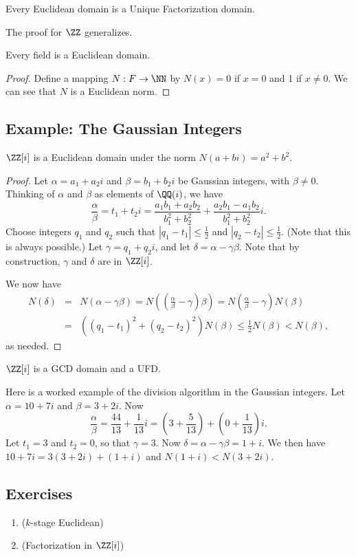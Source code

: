 \documentclass{article}
\begin{document}
\begin{prop}
Every Euclidean domain is a Unique Factorization domain.
\end{prop}

The proof for $\ZZ$ generalizes.

\begin{prop}
Every field is a Euclidean domain.
\end{prop}

\begin{proof}
Define a mapping $N : F \rightarrow \NN$ by $N(x) = 0$ if $x = 0$ and 1 if $x \neq 0$. We can see that $N$ is a Euclidean norm.
\end{proof}

\subsection*{Example: The Gaussian Integers}

\begin{prop}
$\ZZ[i]$ is a Euclidean domain under the norm $N(a+bi) = a^2 + b^2$.
\end{prop}

\begin{proof}
Let $\alpha = a_1 + a_2 i$ and $\beta = b_1 + b_2 i$ be Gaussian integers, with $\beta \neq 0$. Thinking of $\alpha$ and $\beta$ as elements of $\QQ(i)$, we have \[ \frac{\alpha}{\beta} = t_1 + t_2 i = \frac{a_1b_1 + a_2b_2}{b_1^2 + b_2^2} + \frac{a_2b_1 - a_1b_2}{b_1^2 + b_2^2} i. \] Choose integers $q_1$ and $q_2$ such that $|q_1 - t_1| \leq \frac{1}{2}$ and $|q_2 - t_2| \leq \frac{1}{2}$. (Note that this is always possible.) Let $\gamma = q_1 + q_2 i$, and let $\delta = \alpha - \gamma\beta$. Note that by construction, $\gamma$ and $\delta$ are in $\ZZ[i]$.

We now have
\begin{eqnarray*}
N(\delta) & = & N(\alpha - \gamma\beta) = N\left((\frac{\alpha}{\beta} - \gamma)\beta\right) = N(\frac{\alpha}{\beta} - \gamma)N(\beta) \\
 & = & ((q_1-t_1)^2 + (q_2-t_2)^2)N(\beta) \leq \frac{1}{2}N(\beta) < N(\beta),
\end{eqnarray*}
as needed.
\end{proof}

\begin{cor}
$\ZZ[i]$ is a GCD domain and a UFD.
\end{cor}

Here is a worked example of the division algorithm in the Gaussian integers. Let $\alpha = 10+7i$ and $\beta = 3+2i$. Now \[ \frac{\alpha}{\beta} = \frac{44}{13} + \frac{1}{13}i = (3 + \frac{5}{13}) + (0 + \frac{1}{13})i. \] Let $t_1 = 3$ and $t_2 = 0$, so that $\gamma = 3$. Now $\delta = \alpha - \gamma\beta = 1+i$. We then have $10+7i = 3(3+2i) + (1+i)$ and $N(1+i) < N(3+2i)$.

\subsection*{Exercises}

\begin{enumerate}
\item ($k$-stage Euclidean)

\item (Factorization in $\ZZ[i]$)
\end{enumerate}
\end{document}
